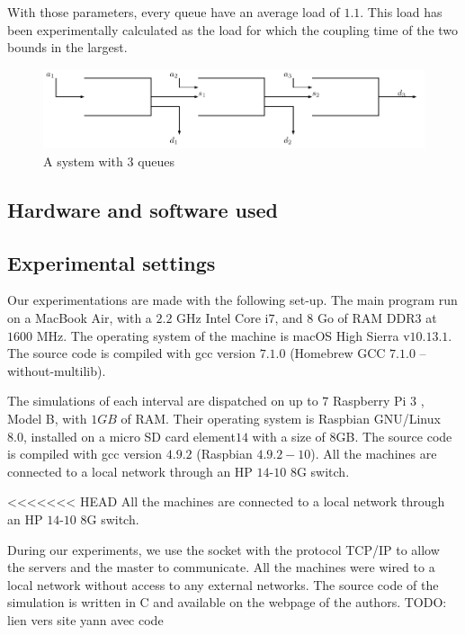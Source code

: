 \documentclass[a4paper,10pt]{article}
\newcommand{\todo}[1]{{\color{red} TODO: {#1}}}
\begin{document}
With those parameters, every queue have an average load of $1.1$. This load has been experimentally calculated as the load for which the coupling time of the two bounds in the largest.

\begin{figure}[h]
 \includegraphics[scale=0.75]{tandem.pdf}
 \caption{A system with 3 queues}
\end{figure}

\subsection{Hardware and software used}

\subsection{Experimental settings}

Our experimentations are made with the following set-up.
The main program run on a MacBook Air, with a $2.2$ GHz Intel Core i$7$, and $8$ Go of RAM DDR$3$ at $1600$ MHz. The operating system of the machine is macOS High Sierra v$10.13.1$. The source code is compiled with  gcc version $7.1.0$ (Homebrew GCC $7.1.0$ -- without-multilib).

The simulations of each interval are dispatched on up to $7$ Raspberry Pi $3$ , Model B, with $1GB$ of RAM. Their operating system is  Raspbian GNU/Linux $8.0$, installed on a micro SD card element$14$ with a size of $8$GB. The source code is compiled with gcc version $4.9.2$ (Raspbian $4.9.2-10$). All the machines are connected to a local network through an HP $14$-$10$ $8$G switch.

<<<<<<< HEAD
All the machines are connected to a local network through an HP $14$-$10$ $8$G switch. 

During our experiments, we use the socket with the protocol TCP/IP to allow the servers and the master to communicate. All the machines were wired to a local network without access to any external networks. The source code of the simulation is written in C and available on the webpage of the authors. 
\todo{lien vers site yann avec code}
\end{document}
